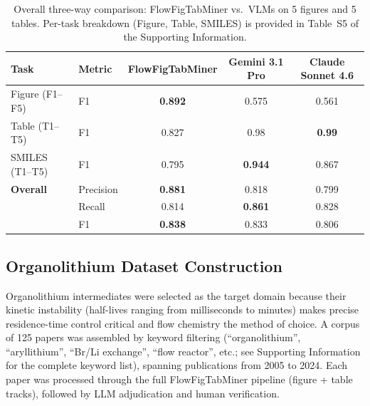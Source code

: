 \documentclass[journal=jcisd8,manuscript=article]{achemso}
\begin{document}
\begin{table}[htbp]
\centering
\caption{Overall three-way comparison: FlowFigTabMiner vs.\ VLMs on 5 figures and 5 tables. Per-task breakdown (Figure, Table, SMILES) is provided in Table~S5 of the Supporting Information.}
\label{tab:three-way-comparison}
\begin{tabular}{llccc}
\toprule
\textbf{Task} & \textbf{Metric} & \textbf{FlowFigTabMiner} & \textbf{Gemini 3.1 Pro} & \textbf{Claude Sonnet 4.6} \\
\midrule
Figure (F1--F5)  & F1 & \textbf{0.892} & 0.575 & 0.561 \\
Table (T1--T5)   & F1 & 0.827 & 0.98  & \textbf{0.99} \\
SMILES (T1--T5)  & F1 & 0.795 & \textbf{0.944} & 0.867 \\
\midrule
\textbf{Overall} & Precision & \textbf{0.881} & 0.818 & 0.799 \\
                & Recall    & 0.814 & \textbf{0.861} & 0.828 \\
                & F1        & \textbf{0.838} & 0.833 & 0.806 \\
\bottomrule
\end{tabular}
\end{table}


\FloatBarrier
\subsection{Organolithium Dataset Construction}

Organolithium intermediates were selected as the target domain because their kinetic instability (half-lives ranging from milliseconds to minutes) makes precise residence-time control critical and flow chemistry the method of choice.\cite{Yoshida2008flash}
A corpus of 125 papers was assembled by keyword filtering (``organolithium'', ``aryllithium'', ``Br/Li exchange'', ``flow reactor'', etc.; see Supporting Information for the complete keyword list), spanning publications from 2005 to 2024.
Each paper was processed through the full FlowFigTabMiner pipeline (figure + table tracks), followed by LLM adjudication and human verification.
\end{document}

